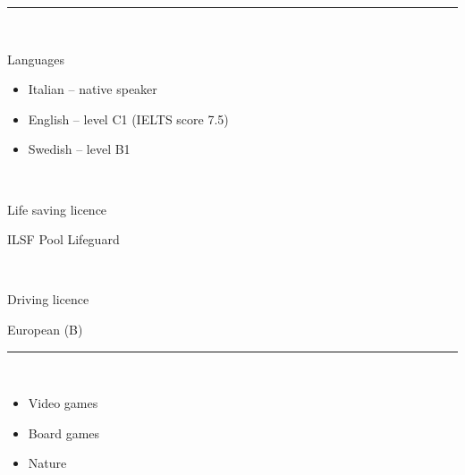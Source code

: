\documentclass[a4paper,10pt]{article}
\newlength{\cvcolumngapwidth}
\newlength{\cvleftcolumnwidth}
\newlength{\cvrightcolumnwidth}
\newcommand{\cvsectionstyle}[1]{{\normalsize\cvsectionfont\textcolor{cvsectioncolor}{#1}}}
\newcommand{\cvheadingstyle}[1]{{\normalsize\cvheadingfont\textcolor{cvheadingcolor}{#1}}}
\newlength{\cvafteritemskipamount}
\newlength{\cvaftersectionskipamount}
\newlength{\cvbetweensectionandheadingextraskipamount}
\newlength{\cvparskip}
\newcommand{\cvsection}[1]{
    \begin{minipage}[t]{\cvleftcolumnwidth}
        \raggedleft\cvsectionstyle{#1}
    \end{minipage}%
    \hspace{\cvcolumngapwidth}%
    \begin{minipage}[t]{\cvrightcolumnwidth}
        \textcolor{cvrulecolor}{\rule{\cvrightcolumnwidth}{0.3mm}}
    \end{minipage}

    \vspace{\cvaftersectionskipamount}
}
\newcommand{\cvitem}[2]{
    \begin{minipage}[t]{\cvleftcolumnwidth}
        \raggedleft #1
    \end{minipage}%
    \hspace{\cvcolumngapwidth}%
    \begin{minipage}[t]{\cvrightcolumnwidth}
        \setlength{\parskip}{\cvparskip} #2
    \end{minipage}

    \vspace{\cvafteritemskipamount}
}
\begin{document}

\cvsection{SKILLS}

\vspace{\cvbetweensectionandheadingextraskipamount}

\cvitem{
    \ 
}{
    \cvheadingstyle{Languages}
    \begin{itemize}[leftmargin=*]
        \item Italian -- native speaker
        \item English -- level C1 (IELTS score 7.5)
        \item Swedish -- level B1
    \end{itemize}
    
}


\cvitem{
    \ 
}{
    \cvheadingstyle{Life saving licence} 
    
    ILSF Pool Lifeguard
}

\cvitem{
    \ 
}{
    \cvheadingstyle{Driving licence} 
    
    European (B)
}



\cvsection{INTERESTS}

\vspace{\cvbetweensectionandheadingextraskipamount}


\cvitem{
    \ 
}{
    \begin{itemize}[leftmargin=*]
    \item Video games
    \item Board games
    \item Nature
    \end{itemize}
    }
\end{document}
